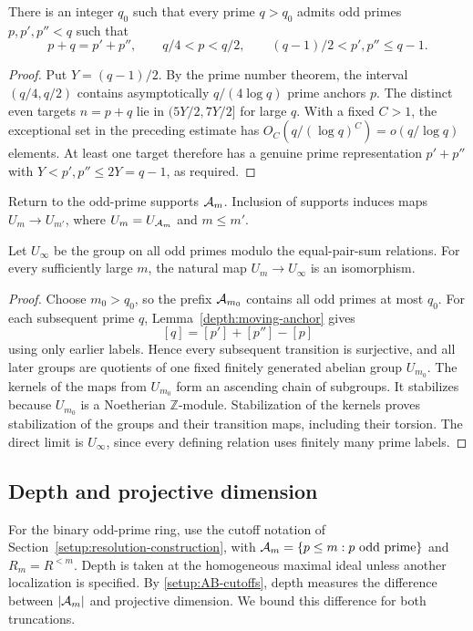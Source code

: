 \begin{lemma}\label{depth:moving-anchor}
There is an integer $q_0$ such that every prime $q>q_0$ admits odd primes
$p,p',p''<q$ such that
\[
 p+q=p'+p'',\qquad q/4<p<q/2,\qquad (q-1)/2<p',p''\le q-1.
\]
\end{lemma}
\begin{proof}
Put $Y=(q-1)/2$. By the prime number theorem, the interval $(q/4,q/2)$
contains asymptotically $q/(4\log q)$ prime anchors $p$. The distinct
even targets $n=p+q$ lie in $(5Y/2,7Y/2]$ for large $q$. With a fixed
$C>1$, the exceptional set in the preceding estimate has
$O_C(q/(\log q)^C)=o(q/\log q)$ elements. At least one target
therefore has a genuine prime representation $p'+p''$ with
$Y<p',p''\le2Y=q-1$, as required.
\end{proof}


Return to the odd-prime supports $\mathcal A_m$.
Inclusion of supports induces maps
$U_m\to U_{m'}$, where
$U_m=U_{\mathcal A_m}$ and $m\le m'$.

\begin{theorem}\label{depth:integral-stabilization}
Let $U_\infty$ be the group on all odd primes modulo the
equal-pair-sum relations. For every sufficiently large $m$, the natural
map $U_m\to U_\infty$ is an isomorphism.
\end{theorem}
\begin{proof}
Choose $m_0>q_0$, so the prefix $\mathcal A_{m_0}$ contains all odd primes
at most $q_0$. For each
subsequent prime $q$, Lemma~\ref{depth:moving-anchor} gives
\[
 [q]=[p']+[p'']-[p]
\]
using only earlier labels. Hence every subsequent transition is
surjective, and all later groups are quotients of one fixed finitely
generated abelian group $U_{m_0}$. The kernels of the maps from $U_{m_0}$ form an
ascending chain of subgroups. It stabilizes because $U_{m_0}$ is a Noetherian
$\mathbb Z$-module. Stabilization of the kernels proves stabilization
of the groups and their transition maps, including their torsion.
The direct limit is $U_\infty$, since every defining relation
uses finitely many prime labels.
\end{proof}

\subsection{Depth and projective dimension}

For the binary odd-prime ring, use the cutoff notation of
Section~\ref{setup:resolution-construction}, with
$\mathcal A_m=\{p\le m:p\text{ odd prime}\}$ and $R_m=R^{<m}$.
Depth is taken at the homogeneous maximal ideal unless another
localization is specified. By \eqref{setup:AB-cutoffs}, depth measures
the difference between $|\mathcal A_m|$ and projective dimension. We bound
this difference for both truncations.

